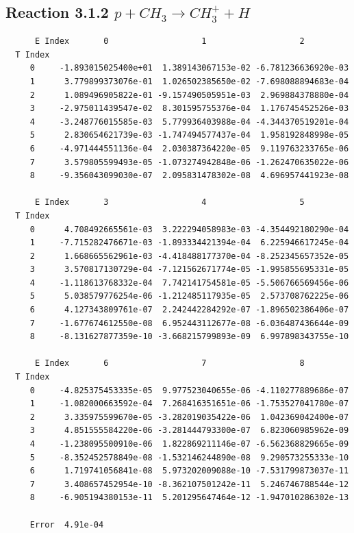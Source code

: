 \documentclass[12pt,dvipdfmx]{article}
\begin{document}
\subsection{
Reaction 3.1.2    $p + CH_3 \rightarrow CH_3^+ + H $
}


\begin{small}\begin{verbatim}
      E Index       0                   1                   2
  T Index
     0     -1.893015025400e+01  1.389143067153e-02 -6.781236636920e-03
     1      3.779899373076e-01  1.026502385650e-02 -7.698088894683e-04
     2      1.089496905822e-01 -9.157490505951e-03  2.969884378880e-04
     3     -2.975011439547e-02  8.301595755376e-04  1.176745452526e-03
     4     -3.248776015585e-03  5.779936403988e-04 -4.344370519201e-04
     5      2.830654621739e-03 -1.747494577437e-04  1.958192848998e-05
     6     -4.971444551136e-04  2.030387364220e-05  9.119763233765e-06
     7      3.579805599493e-05 -1.073274942848e-06 -1.262470635022e-06
     8     -9.356043099030e-07  2.095831478302e-08  4.696957441923e-08

      E Index       3                   4                   5
  T Index
     0      4.708492665561e-03  3.222294058983e-03 -4.354492180290e-04
     1     -7.715282476671e-03 -1.893334421394e-04  6.225946617245e-04
     2      1.668665562961e-03 -4.418488177370e-04 -8.252345657352e-05
     3      3.570817130729e-04 -7.121562671774e-05 -1.995855695331e-05
     4     -1.118613768332e-04  7.742141754581e-05 -5.506766569456e-06
     5      5.038579776254e-06 -1.212485117935e-05  2.573708762225e-06
     6      4.127343809761e-07  2.242442284292e-07 -1.896502386406e-07
     7     -1.677674612550e-08  6.952443112677e-08 -6.036487436644e-09
     8     -8.131627877359e-10 -3.668215799893e-09  6.997898343755e-10

      E Index       6                   7                   8
  T Index
     0     -4.825375453335e-05  9.977523040655e-06 -4.110277889686e-07
     1     -1.082000663592e-04  7.268416351651e-06 -1.753527041780e-07
     2      3.335975599670e-05 -3.282019035422e-06  1.042369042400e-07
     3      4.851555584220e-06 -3.281444793300e-07  6.823060985962e-09
     4     -1.238095500910e-06  1.822869211146e-07 -6.562368829665e-09
     5     -8.352452578849e-08 -1.532146244890e-08  9.290573255333e-10
     6      1.719741056841e-08  5.973202009088e-10 -7.531799873037e-11
     7      3.408657452954e-10 -8.362107501242e-11  5.246746788544e-12
     8     -6.905194380153e-11  5.201295647464e-12 -1.947010286302e-13

     Error  4.91e-04
\end{verbatim}\end{small}
\end{document}
